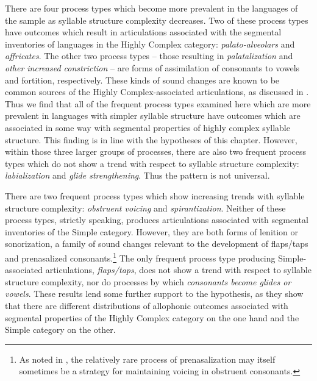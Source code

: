   There are four process types which become more prevalent in the languages of the sample as syllable structure complexity decreases. Two of these process types have outcomes which result in articulations associated with the segmental inventories of languages in the Highly Complex category: \textit{palato-alveolars} and \textit{affricates}. The other two process types -- those resulting in \textit{palatalization} and \textit{other increased constriction} -- are forms of assimilation of consonants to vowels and fortition, respectively. These kinds of sound changes are known to be common sources of the Highly Complex-associated articulations, as discussed in . Thus we find that all of the frequent process types examined here which are more prevalent in languages with simpler syllable structure have outcomes which are associated in some way with segmental properties of highly complex syllable structure. This finding is in line with the hypotheses of this chapter. However, within those three larger groups of processes, there are also two frequent process types which do not show a trend with respect to syllable structure complexity: \textit{labialization} and \textit{glide strengthening}. Thus the pattern is not universal.

  There are two frequent process types which show increasing trends with syllable structure complexity: \textit{obstruent voicing} and \textit{spirantization}. Neither of these process types, strictly speaking, produces articulations associated with segmental inventories of the Simple category. However, they are both forms of lenition or sonorization, a family of sound changes relevant to the development of flaps/taps and prenasalized consonants.\footnote{{As noted in , the relatively rare process of prenasalization may itself sometimes be a strategy for maintaining voicing in obstruent consonants.}} The only frequent process type producing Simple-associated articulations, \textit{flaps/taps}, does not show a trend with respect to syllable structure complexity, nor do processes by which \textit{consonants become glides or vowels}. These results lend some further support to the hypothesis, as they show that there are different distributions of allophonic outcomes associated with segmental properties of the Highly Complex category on the one hand and the Simple category on the other.

